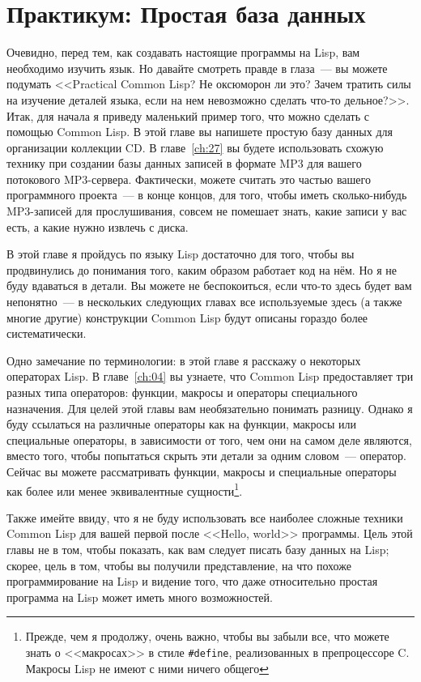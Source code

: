 \chapter{Практикум: Простая база данных}
\label{ch:03}

Очевидно, перед тем, как создавать настоящие программы на Lisp, вам необходимо изучить
язык. Но давайте смотреть правде в глаза~--- вы можете подумать <<Practical Common Lisp?
Не оксюморон ли это? Зачем тратить силы на изучение деталей языка, если на нем невозможно
сделать что-то дельное?>>. Итак, для начала я приведу маленький пример того, что можно
сделать с помощью Common Lisp. В этой главе вы напишете простую базу данных для
организации коллекции CD. В главе~\ref{ch:27} вы будете использовать схожую технику при создании
базы данных записей в формате MP3 для вашего потокового MP3-сервера. Фактически, можете
считать это частью вашего программного проекта~--- в конце концов, для того, чтобы иметь
сколько-нибудь MP3-записей для прослушивания, совсем не помешает знать, какие записи у вас
есть, а какие нужно извлечь с диска.
 

В этой главе я пройдусь по языку Lisp достаточно для того, чтобы вы продвинулись до
понимания того, каким образом работает код на нём. Но я не буду вдаваться в детали. Вы
можете не беспокоиться, если что-то здесь будет вам непонятно~--- в нескольких следующих
главах все используемые здесь (а также многие другие) конструкции Common Lisp будут
описаны гораздо более систематически.

Одно замечание по терминологии: в этой главе я расскажу о некоторых операторах Lisp. В
главе~\ref{ch:04} вы узнаете, что Common Lisp предоставляет три разных типа операторов: функции,
макросы и операторы специального назначения. Для целей этой главы вам необязательно
понимать разницу. Однако я буду ссылаться на различные операторы как на функции, макросы
или специальные операторы, в зависимости от того, чем они на самом деле являются, вместо
того, чтобы попытаться скрыть эти детали за одним словом~--- оператор. Сейчас вы можете
рассматривать функции, макросы и специальные операторы как более или менее эквивалентные
сущности\footnote{Прежде, чем я продолжу, очень важно, чтобы вы забыли все, что можете
  знать о <<макросах>> в стиле \lstinline!#define!, реализованных в препроцессоре C. Макросы
  Lisp не имеют с ними ничего общего}.

Также имейте ввиду, что я не буду использовать все наиболее сложные техники Common Lisp
для вашей первой после <<Hello, world>> программы. Цель этой главы не в том, чтобы показать,
как вам следует писать базу данных на Lisp; скорее, цель в том, чтобы вы получили
представление, на что похоже программирование на Lisp и видение того, что даже
относительно простая программа на Lisp может иметь много возможностей.

